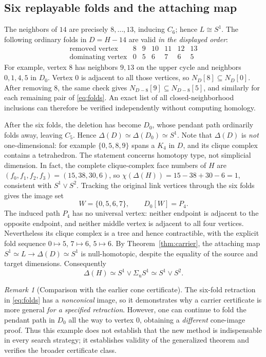 \documentclass[11pt,letterpaper]{article}
\theoremstyle{definition}
\theoremstyle{remark}
\newtheorem{remark}[theorem]{Remark}
\newcommand{\Del}{\Delta}
\newcommand{\SigmaU}{\Sigma_{\mathrm u}}
\newcommand{\N}{N}
\begin{document}
\subsection{Six replayable folds and the attaching map}
The neighbors of \(14\) are precisely \(8,\ldots,13\), inducing \(C_6\); hence \(L\cong S^1\). The following ordinary folds in \(D=H-14\) are valid \emph{in the displayed order}:
\[
\begin{array}{c|rrrrrr}
\text{removed vertex}&8&9&10&11&12&13\\ \hline
\text{dominating vertex}&0&5&6&7&6&5
\end{array}
\tag{\(*\)}\label{eq:folds}
\]
For example, vertex \(8\) has neighbors \(9,13\) on the upper cycle and neighbors \(0,1,4,5\) in \(D_0\). Vertex \(0\) is adjacent to all those vertices, so \(\N_D[8]\subseteq\N_D[0]\). After removing \(8\), the same check gives \(\N_{D-8}[9]\subseteq\N_{D-8}[5]\), and similarly for each remaining pair of \eqref{eq:folds}. An exact list of all closed-neighborhood inclusions can therefore be verified independently without computing homology.

After the six folds, the deletion has become \(D_0\), whose pendant path ordinarily folds away, leaving \(C_5\). Hence \(\Del(D)\simeq\Del(D_0)\simeq S^1\). Note that
\(\Del(D)\) is \emph{not} one-dimensional: for example
\(\{0,5,8,9\}\) spans a \(K_4\) in \(D\), and its clique complex
contains a tetrahedron. The statement concerns homotopy type, not
simplicial dimension. In fact, the complete clique-complex face
numbers of \(H\) are \((f_0,f_1,f_2,f_3)=(15,38,30,6)\),
so \(\chi(\Del(H))=15-38+30-6=1\), consistent with
\(S^1\vee S^2\). Tracking the original link vertices through the six folds gives the image set
\[
 W=\{0,5,6,7\},\qquad D_0[W]=P_4.
\]
The induced path \(P_4\) has no universal vertex: neither endpoint is adjacent to the opposite endpoint, and neither middle vertex is adjacent to all four vertices. Nevertheless its clique complex is a tree and hence contractible, with the explicit fold sequence \(0\mapsto5\), \(7\mapsto6\), \(5\mapsto6\). By Theorem~\ref{thm:carrier}, the attaching map \(S^1\simeq L\to\Del(D)\simeq S^1\) is null-homotopic, despite the equality of the source and target dimensions. Consequently
\[
\boxed{\Del(H)\simeq S^1\vee\SigmaU S^1\simeq S^1\vee S^2.}
\]

\begin{remark}[Comparison with the earlier cone certificate]
The six-fold retraction in \eqref{eq:folds} has a \emph{nonconical} image, so it demonstrates why a carrier certificate is more general \emph{for a specified retraction}. However, one can continue to fold the pendant path in \(D_0\) all the way to vertex \(0\), obtaining a \emph{different} cone-image proof. Thus this example does not establish that the new method is indispensable in every search strategy; it establishes validity of the generalized theorem and verifies the broader certificate class.
\end{remark}
\end{document}
